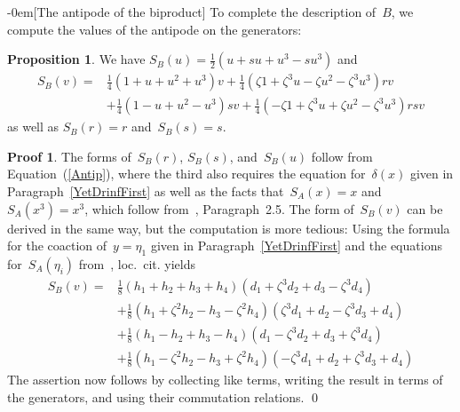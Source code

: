 \documentclass{article}
\makeatletter
\renewcommand{\subsection}{\@startsection{subsection}{2}{0em}%
{\baselineskip}{-0em}{\bfseries\normalsize}}
\numberwithin{equation}{section}
\theoremstyle{definition}
\newtheorem*{prop}{Proposition}
\newtheorem*{pf}{Proof}
\theoremstyle{break}
\newcommand{\sbb}{S_{B}}
\newcommand{\K}{1}
\newcommand{\1}{{(1)}}
\newcommand{\2}{{(2)}}
\newcommand{\3}{{(3)}}
\newcommand{\sa}{S_{A}}
\makeatother
\begin{document}
\subsection[The antipode of the biproduct]{} \label{AntBiprod}
To complete the description of~$B$, we compute the values of the antipode on the generators:
\begin{prop}
We have $\sbb(u) = \frac{\K}{2} (u + s u + u^3 - s u^3)$ and
\begin{align*}
\sbb \left( v \right) = {} &
\frac{1}{4} \left(1 + u + u^2 + u^3 \right) v
+ \frac{1}{4} \left(\zeta 1 + \zeta^3 u - \zeta u^2 - \zeta^3 u^3 \right) r v \\
&+ \frac{1}{4} \left(1 - u + u^2 - u^3 \right) s v
+ \frac{1}{4}  \left(- \zeta 1 + \zeta^3 u
+ \zeta u^2 - \zeta^3 u^3 \right) r s v
\end{align*}
as well as $\sbb(r) = r$ and~$\sbb(s) = s$.
\end{prop}
\begin{pf}
The forms of~$\sbb(r)$, $\sbb(s)$, and~$\sbb(u)$ follow from Equation~(\ref{Antip}), where the third also requires the equation for~$\delta(x)$ given in Paragraph~\ref{YetDrinfFirst} as well as the facts that~$\sa(x) = x$ and $\sa(x^3) = x^3$, which follow from~\cite{KaSo2}, Paragraph~2.5. The form of~$\sbb(v)$ can be derived in the same way, but the computation is more tedious: Using the formula for the coaction of~$y = \eta_1$ given in Paragraph~\ref{YetDrinfFirst} and the equations for~$\sa(\eta_i)$ from~\cite{KaSo2}, loc.~cit. yields
\begin{align*}
\sbb \left( v \right)
= {} & \frac{1}{8} (h_1+h_2+h_3+h_4)  \left(d_1 + \zeta^3 d_2 + d_3 - \zeta^3 d_4 \right) \\
&+ \frac{1}{8}(h_1+\zeta^2 h_2-h_3-\zeta^2 h_4) \left(\zeta^3d_1 + d_2 - \zeta^3 d_3 + d_4 \right)\\
&+\frac{1}{8} (h_1-h_2+h_3-h_4)  \left(d_1 - \zeta^3 d_2 + d_3 + \zeta^3 d_4 \right)  \\
&+ \frac{1}{8}(h_1-\zeta^2 h_2-h_3+\zeta^2 h_4)  \left(- \zeta^3d_1 +  d_2 + \zeta^3 d_3 + d_4 \right)
\end{align*}
The assertion now follows by collecting like terms, writing the result in terms of the generators, and using their commutation relations.
\qed
\end{pf}
\enlargethispage{10pt}
\end{document}
